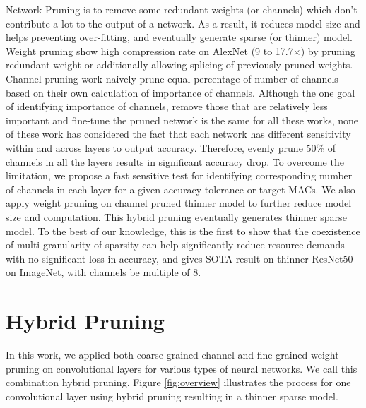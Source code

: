 \documentclass{article}
\begin{document}
Network Pruning is to remove some redundant weights (or channels) which don’t contribute a lot to the output of a network. As a result, it reduces model size and helps preventing over-fitting, and eventually generate sparse (or thinner) model. %
Weight pruning \cite{han2015learning}\cite{guo2016dynamic} show high compression rate on AlexNet (9 to 17.7$\times$) by pruning redundant weight or additionally allowing splicing of previously pruned weights. %
Channel-pruning work \cite{Li2016PruningFF}\cite{Molchanov2016PruningCN}\cite{luo2017thinet}\cite{He_2017_ICCV}\cite{Liu2017learning} naively prune equal percentage of number of channels based on their own calculation of importance of channels. Although the one goal of identifying importance of channels, remove those that are relatively less important and fine-tune the pruned network is the same for all these works, none of these work has considered the fact that each network has different sensitivity within and across layers to output accuracy. Therefore, evenly prune 50\% of channels in all the layers results in significant accuracy drop.  
To overcome the limitation, we propose a fast sensitive test for identifying corresponding number of channels in each layer for a given accuracy tolerance or target MACs. We also apply weight pruning on channel pruned thinner model to further reduce model size and computation. This hybrid pruning eventually generates thinner sparse model. To the best of our knowledge, this is the first to show that the coexistence of multi granularity of sparsity can help significantly reduce resource demands with no significant loss in accuracy, and gives SOTA result on thinner ResNet50 on ImageNet, with channels be multiple of 8. %


\section{Hybrid Pruning}
\label{sec:hybrid}
In this work, we applied both coarse-grained channel and fine-grained weight pruning on convolutional layers for various types of neural networks. We call this combination hybrid pruning. Figure \ref{fig:overview} illustrates the process for one convolutional layer using hybrid pruning resulting in a thinner sparse model.
\end{document}
